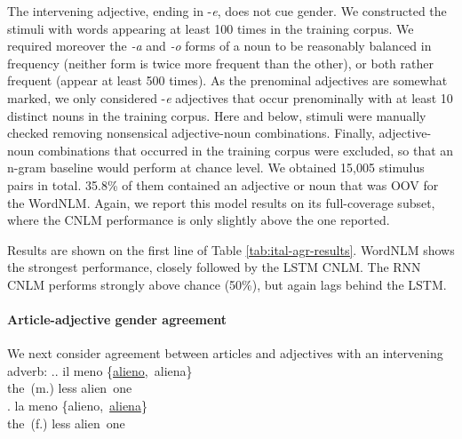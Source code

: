 The intervening adjective, ending in -\emph{e}, does not cue
gender. We constructed the stimuli with words appearing at least 100
times in the training corpus. We required moreover the \emph{-a}
and \emph{-o} forms of a noun to be reasonably balanced in frequency
(neither form is twice more frequent than the other), or both rather
frequent (appear at least 500 times). As the prenominal adjectives are
somewhat marked, we only considered -\emph{e} adjectives that occur
prenominally with at least 10 distinct nouns in the training corpus.
Here and below, stimuli were manually checked removing nonsensical
adjective-noun combinations. Finally, adjective-noun combinations that
occurred in the training corpus were excluded, so that an n-gram
baseline would perform at chance level. We obtained 15,005 stimulus
pairs in total. %
35.8\% of them contained an adjective or noun that was
OOV for the WordNLM. Again, we report this model results on its
full-coverage subset, where the CNLM performance is only slightly above
the one reported.

Results are shown on the first line of
Table \ref{tab:ital-agr-results}.  WordNLM shows the strongest
performance, closely followed by the LSTM CNLM.  The RNN CNLM
performs strongly above chance (50\%), but again lags behind the LSTM.

\paragraph{Article-adjective gender agreement}
We next consider agreement between articles and adjectives with an intervening adverb:
\ex.\ag. il meno \{\underline{alieno},\ aliena\} \\
the\ (m.) less alien\ one \\
\bg. la meno \{alieno,\ \underline{aliena}\} \\
the\ (f.) less alien\ one \\

